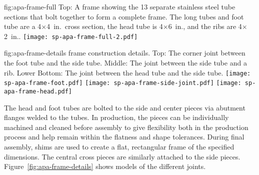 
\begin{dunefigure}{fig:apa-frame-full}
{Top: A   frame showing the \num{13} separate stainless steel tube sections that bolt together to form a complete frame.  The long tubes and foot tube are a \num{4}$\times$\SI{4}{in}.\ cross section, the head tube is \num{4}$\times$\SI{6}{in}., and the ribs are \num{4}$\times$\SI{2}{in}.. %
}
\texttt{[image: sp-apa-frame-full-2.pdf]}
\end{dunefigure}

\begin{dunefigure}{fig:apa-frame-details}
{ frame construction details. Top: The corner joint between the foot tube and the side tube. Middle: The joint between the side tube and a rib. Lower Bottom: The joint between the head tube and the side tube.}
\texttt{[image: sp-apa-frame-foot.pdf]}
\texttt{[image: sp-apa-frame-side-joint.pdf]}
\texttt{[image: sp-apa-frame-head.pdf]}
\end{dunefigure}

The head and foot tubes are bolted to the side and center pieces via abutment flanges welded to the tubes. In production, the pieces can be individually machined and cleaned before assembly to give flexibility both in the production process and help remain within the flatness and shape tolerances.  During final assembly, shims are used to create a flat, rectangular frame of the specified dimensions.  The central cross pieces are similarly attached to the side pieces.  Figure~\ref{fig:apa-frame-details} shows models of the different joints.   

